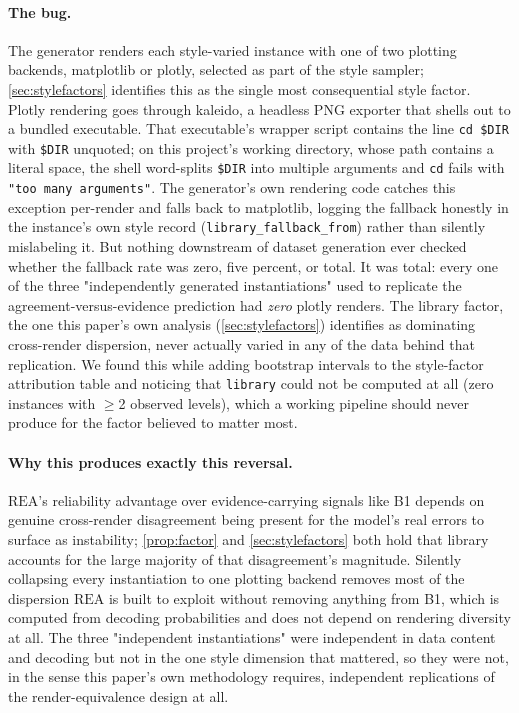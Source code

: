 \documentclass[11pt]{article}
\newcommand{\rea}{\mathrm{REA}}
\begin{document}
\paragraph{The bug.} The generator renders each style-varied instance with one of two plotting backends, matplotlib or plotly, selected as part of the style sampler; \cref{sec:stylefactors} identifies this as the single most consequential style factor. Plotly rendering goes through kaleido, a headless PNG exporter that shells out to a bundled executable. That executable's wrapper script contains the line \texttt{cd \$DIR} with \texttt{\$DIR} unquoted; on this project's working directory, whose path contains a literal space, the shell word-splits \texttt{\$DIR} into multiple arguments and \texttt{cd} fails with \texttt{"too many arguments"}. The generator's own rendering code catches this exception per-render and falls back to matplotlib, logging the fallback honestly in the instance's own style record (\texttt{library\_fallback\_from}) rather than silently mislabeling it. But nothing downstream of dataset generation ever checked whether the fallback rate was zero, five percent, or total. It was total: every one of the three "independently generated instantiations" used to replicate the agreement-versus-evidence prediction had \emph{zero} plotly renders. The library factor, the one this paper's own analysis (\cref{sec:stylefactors}) identifies as dominating cross-render dispersion, never actually varied in any of the data behind that replication. We found this while adding bootstrap intervals to the style-factor attribution table and noticing that \texttt{library} could not be computed at all (zero instances with $\ge$2 observed levels), which a working pipeline should never produce for the factor believed to matter most.

\paragraph{Why this produces exactly this reversal.} $\rea$'s reliability advantage over evidence-carrying signals like B1 depends on genuine cross-render disagreement being present for the model's real errors to surface as instability; \cref{prop:factor} and \cref{sec:stylefactors} both hold that library accounts for the large majority of that disagreement's magnitude. Silently collapsing every instantiation to one plotting backend removes most of the dispersion $\rea$ is built to exploit without removing anything from B1, which is computed from decoding probabilities and does not depend on rendering diversity at all. The three "independent instantiations" were independent in data content and decoding but not in the one style dimension that mattered, so they were not, in the sense this paper's own methodology requires, independent replications of the render-equivalence design at all.
\end{document}
